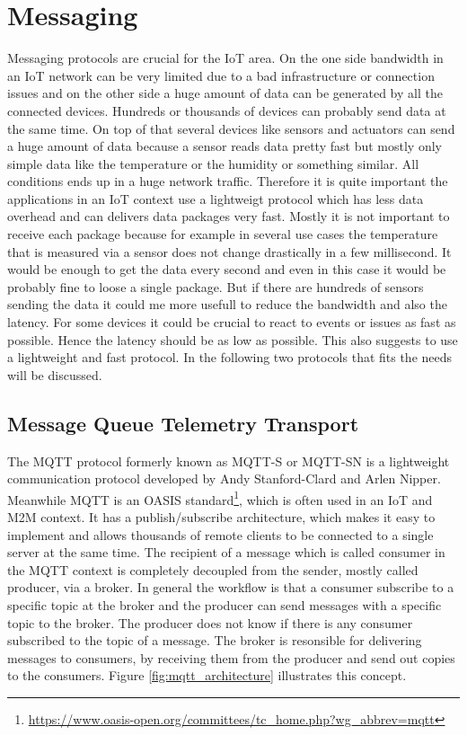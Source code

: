 \section{Messaging}
Messaging protocols are crucial for the \ac{IoT} area.
On the one side bandwidth in an \ac{IoT} network can be very limited due to a bad infrastructure or connection issues and on the other side a huge amount of data can be generated by all the connected devices.
Hundreds or thousands of devices can probably send data at the same time.
On top of that several devices like sensors and actuators can send a huge amount of data because a sensor reads data pretty fast but mostly only simple data like the temperature or the humidity or something similar.
All conditions ends up in a huge network traffic.
Therefore it is quite important the applications in an \ac{IoT} context use a lightweigt protocol which has less data overhead and can delivers data packages very fast.
Mostly it is not important to receive each package because for example in several use cases the temperature that is measured via a sensor does not change drastically in a few millisecond.
It would be enough to get the data every second and even in this case it would be probably fine to loose a single package.
But if there are hundreds of sensors sending the data it could me more usefull to reduce the bandwidth and also the latency.
For some devices it could be crucial to react to events or issues as fast as possible.
Hence the latency should be as low as possible.
This also suggests to use a lightweight and fast protocol.
In the following two protocols that fits the needs will be discussed.

\subsection{Message Queue Telemetry Transport}
\label{section:MQTT}
The \ac{MQTT} protocol formerly known as MQTT-S or MQTT-SN is a lightweight communication protocol developed by Andy Stanford-Clard and Arlen Nipper.\autocite[cf.]{MQTT:FAQ}
Meanwhile \ac{MQTT} is an \ac{OASIS} standard\footnote{\url{https://www.oasis-open.org/committees/tc_home.php?wg_abbrev=mqtt}}, which is often used in an \ac{IoT} and \ac{M2M} context.\autocite[cf.][p. 5]{lampkin:2012:mqtt}
It has a publish/subscribe architecture, which makes it easy to implement and allows thousands of remote clients to be connected to a single server at the same time.\autocite[cf.][p. 5]{lampkin:2012:mqtt}
The recipient of a message which is called consumer in the \ac{MQTT} context is completely decoupled from the sender, mostly called producer, via a broker.
In general the workflow is that a consumer subscribe to a specific topic at the broker and the producer can send messages with a specific topic to the broker.
The producer does not know if there is any consumer subscribed to the topic of a message.
The broker is resonsible for delivering messages to consumers, by receiving them from the producer and send out copies to the consumers.
Figure \ref{fig:mqtt_architecture} illustrates this concept.

